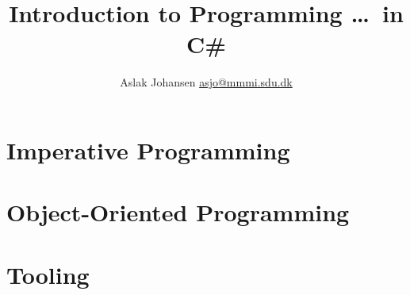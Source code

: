 \documentclass[a4paper, oneside]{memoir}
\begin{document}
\title{Introduction to Programming \ldots\ in C\#}
\author{Aslak Johansen \href{mailto:asjo@mmmi.sdu.dk}{asjo@mmmi.sdu.dk}}
\maketitle
\tableofcontents



\part{Imperative Programming}



\part{Object-Oriented Programming}
\part{Tooling}
\end{document}

